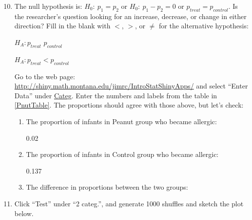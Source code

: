  \begin{enumerate}
  \setcounter{enumi}{9}
 
   \item  The null hypothesis is: $H_0:\  p_1 = p_2$  or $H_0:\  p_1 -
     p_2 = 0$ or $p_{treat} =   p_{control}$. Is the researcher's question looking
     for an increase, decrease, or change in either direction?  Fill
     in the blank with $<$, $>$, or $\neq$ for the alternative
     hypothesis:  

\begin{students}
     $H_A:  p_{treat}$  \underline{\hspace{2cm}}   $p_{control}$
\end{students}
\begin{key}
   $H_A:  p_{treat} < p_{control}$
\end{key}     

   Go to the  web page:
   \url{http://shiny.math.montana.edu/jimrc/IntroStatShinyApps/}
   and select ``Enter Data'' under  \underline{ Categ}.
   Enter the numbers and labels from the table in \ref{PnutTable}.
   The proportions should agree with those above, but let's check:
   \begin{enumerate}
   \item 
     The proportion of infants in Peanut group who became allergic: \\ 
\begin{key}
 0.02       
\end{key}
   \item The proportion of infants in Control group who became allergic: \\ 
\begin{key}
 0.137       
\end{key}
\item The difference in proportions between the two groups: 
\begin{students}
\vspace{2cm}
\end{students}

\begin{key}
  {\it  {} }
\end{key}
\end{enumerate}


   \item  Click ``Test'' under ``2 categ.'', and generate  1000
     shuffles and sketch the plot below. 
\begin{students}
\vspace{4cm}
\end{students}


\end{enumerate}
